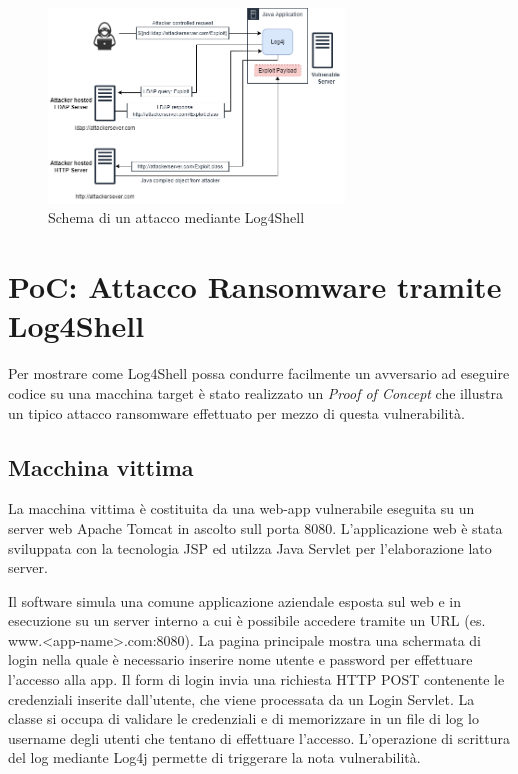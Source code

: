 \documentclass[a4paper, 12pt]{article}
\begin{document}
\begin{figure}
\centering
\includegraphics[width=0.7\textwidth]{img/log4shell.png}
\caption{Schema di un attacco mediante Log4Shell}
\label{fig:log4shellschema}
\end{figure}

\newpage

\section{PoC: Attacco Ransomware tramite Log4Shell}
Per mostrare come Log4Shell possa condurre facilmente un avversario ad eseguire codice su una macchina target è stato realizzato un \emph{Proof of Concept} che illustra un tipico attacco ransomware effettuato per mezzo di questa vulnerabilità.


\subsection{Macchina vittima}
La macchina vittima è costituita da una web-app vulnerabile eseguita su un server web Apache Tomcat in ascolto sull porta 8080.
L'applicazione web è stata sviluppata con la tecnologia JSP ed utilzza Java Servlet per l'elaborazione lato server.

Il software simula una comune applicazione aziendale esposta sul web e in esecuzione su un server interno a cui è possibile accedere tramite un URL (es. www.<app-name>.com:8080).
La pagina principale mostra una schermata di login nella quale è necessario inserire nome utente e password per effettuare l'accesso alla app.
Il form di login invia una richiesta HTTP POST contenente le credenziali inserite dall'utente, che viene processata da un Login Servlet. La classe si occupa di validare le credenziali e di memorizzare in un file di log lo username degli utenti che tentano di effettuare l'accesso.
L'operazione di scrittura del log mediante Log4j permette di triggerare la nota vulnerabilità.
\end{document}
